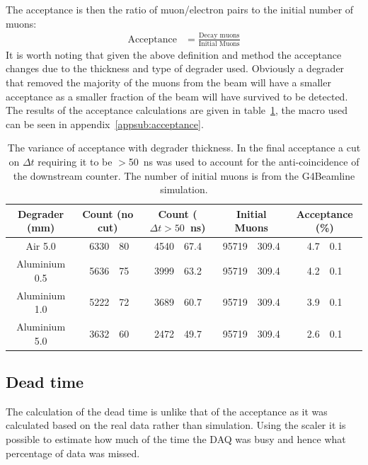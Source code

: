 The acceptance is then the ratio of muon/electron pairs to the initial number of muons:
\begin{align}
    \text{Acceptance} &= \frac{\text{Decay muons}}{\text{Initial Muons}} \label{equ:acceptance}
\end{align}
It is worth noting that given the above definition and method the acceptance changes due to the thickness and type of degrader used. Obviously a degrader that removed the majority of the muons from the beam will have a smaller acceptance as a smaller fraction of the beam will have survived to be detected. The results of the acceptance calculations are given in table~\ref{tab:acceptance}, the macro used can be seen in appendix~\ref{appsub:acceptance}.
\begin{table}
    \begin{center}
    \begin{tabular}{c| r@{ $\pm$ }l | r@{ $\pm$ }l | r@{ $\pm$ }l | r@{ $\pm$ }l }
        Degrader (mm) & \multicolumn{2}{|c}{Count (no cut)} &
                        \multicolumn{2}{|c}{Count ($\Delta t>50$~ns)} &
                        \multicolumn{2}{|c}{Initial Muons} &
                        \multicolumn{2}{|c}{Acceptance (\%)}\\
        \hline
              Air 5.0 & 6330 & 80 & 4540 & 67.4 & 95719 & 309.4 & 4.7 & 0.1\\
        Aluminium 0.5 & 5636 & 75 & 3999 & 63.2 & 95719 & 309.4 & 4.2 & 0.1\\
        Aluminium 1.0 & 5222 & 72 & 3689 & 60.7 & 95719 & 309.4 & 3.9 & 0.1\\
        Aluminium 5.0 & 3632 & 60 & 2472 & 49.7 & 95719 & 309.4 & 2.6 & 0.1\\
        
    \end{tabular}
    \end{center}
    \caption{The variance of acceptance with degrader thickness. In the final acceptance a cut on $\Delta t$ requiring it to be $>$50~ns was used to account for the anti-coincidence of the downstream counter. The number of initial muons is from the G4Beamline simulation.}
    \label{tab:acceptance}
\end{table}
\subsection{Dead time} %
\label{sub:dead_time}
The calculation of the dead time is unlike that of the acceptance as it was calculated based on the real data rather than simulation. Using the scaler it is possible to estimate how much of the time the DAQ was busy and hence what percentage of data was missed. 

